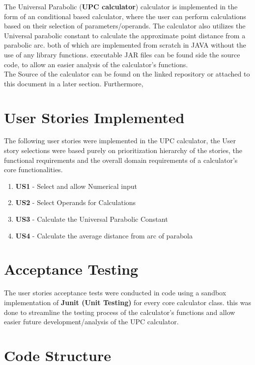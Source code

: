 \documentclass[12pt]{report}
\begin{document}
The  Universal Parabolic (\textbf{UPC calculator}) calculator is implemented in the form of an conditional based calculator, where the user can perform calculations based on their selection of parameters/operands. The calculator also utilizes the Universal parabolic constant to calculate the approximate point distance from a parabolic arc. both of which are implemented from scratch in JAVA without the use of any library functions. executable JAR files can be found side the source code, to allow an easier analysis of the calculator's functions. 
\hfill\break\\
\noindent The Source of the calculator can be found on the linked repository or attached to this document in a later section. Furthermore, 

\section{User Stories Implemented}

The following user stories were implemented in the UPC calculator, the User story selections were based purely on prioritization hierarchy of the stories, the functional requirements and the overall domain requirements of a calculator's core functionalities.

\begin{enumerate}
    \item\textbf{ US1} - Select and allow Numerical input
    \item \textbf{US2} - Select Operands for Calculations
    \item \textbf{US3} - Calculate the Universal Parabolic Constant
    \item \textbf{US4} - Calculate the average distance from arc of parabola
\end{enumerate}

\section{Acceptance Testing}
The user stories acceptance tests were conducted in code using a sandbox implementation of \textbf{Junit (Unit Testing)} for every core calculator class. this was done to streamline the testing process of the calculator's functions and allow easier future development/analysis of the UPC calculator.   

\section{Code Structure}
\end{document}
